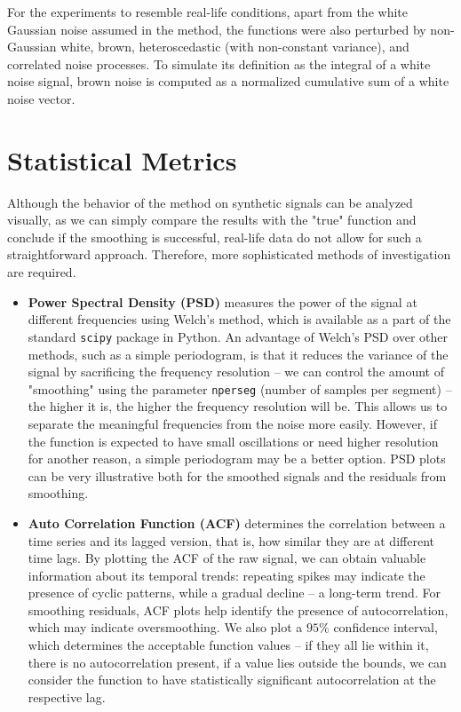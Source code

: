 \documentclass[11pt,leqno]{book}
\theoremstyle{definition}
\theoremstyle{plain}
\theoremstyle{definition}
\begin{document}
{For the experiments to resemble real-life conditions, apart from the white Gaussian noise assumed in the method, the functions were also perturbed by non-Gaussian white, brown, heteroscedastic (with non-constant variance), and correlated noise processes. To simulate its definition as the integral of a white noise signal, brown noise is computed as a normalized cumulative sum of a white noise vector.
\section{Statistical Metrics}
\label{sec:statmet}
Although the behavior of the method on synthetic signals can be analyzed visually, as we can simply compare the results with the "true" function and conclude if the smoothing is successful, real-life data do not allow for such a straightforward approach. Therefore, more sophisticated methods of investigation are required.
\begin{itemize}
    \item \textbf{Power Spectral Density (PSD)} measures the power of the signal at different frequencies using Welch's method, which is available as a part of the standard \texttt{scipy} package in Python. An advantage of Welch's PSD over other methods, such as a simple periodogram, is that it reduces the variance of the signal by sacrificing the frequency resolution -- we can control the amount of "smoothing" using the parameter \texttt{nperseg} (number of samples per segment) -- the higher it is, the higher the frequency resolution will be. This allows us to separate the meaningful frequencies from the noise more easily. However, if the function is expected to have small oscillations or need higher resolution for another reason, a simple periodogram may be a better option. PSD plots can be very illustrative both for the smoothed signals and the residuals from smoothing.
    \item \textbf{Auto Correlation Function (ACF)} determines the correlation between
a time series and its lagged version, that is, how similar they are at different time lags. By
plotting the ACF of the raw signal, we can obtain valuable information about its temporal trends: repeating
spikes may indicate the presence of cyclic patterns, while a gradual decline -- a long-term trend. For smoothing residuals, ACF plots help identify the presence of autocorrelation, which may indicate oversmoothing. We also plot a $95\%$ confidence interval, which determines the acceptable function values -- if they all lie within it, there is no autocorrelation present, if a value lies outside the bounds, we can consider the function to have statistically significant autocorrelation at the respective lag.
    

\end{itemize}}
\end{document}
